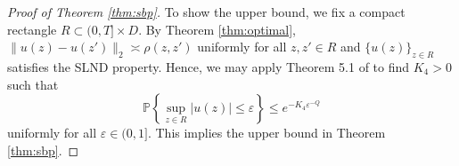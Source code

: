 \documentclass[reqno]{amsart}
\DeclareMathOperator{\Var}{Var}
\renewcommand{\P}{\mathbb P}
\newcommand{\1}{\mathbf 1}
\numberwithin{equation}{section}
\theoremstyle{definition}
\begin{document}
\begin{proof}[Proof of Theorem \ref{thm:sbp}]
To show the upper bound, we fix a compact rectangle $R \subset (0,T] \times D$.
By Theorem \ref{thm:optimal}, $\|u(z)-u(z')\|_2 \asymp \rho(z,z')$ uniformly for all $z,z' \in R$ and $\{u(z)\}_{z \in R}$ satisfies the SLND property.
Hence, we may apply Theorem 5.1 of \cite{X09} to find $K_4>0$ such that
\[
	\P\left\{ \sup_{z \in R} |u(z)| \le \varepsilon \right\} \le e^{-K_4 \varepsilon^{-Q}}
\]
uniformly for all $\varepsilon \in (0,1]$.
This implies the upper bound in Theorem \ref{thm:sbp}.
%
%
%
%
%

\end{proof}
\end{document}
